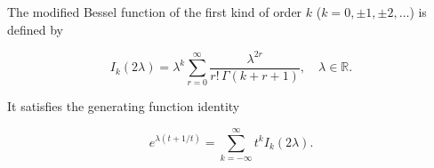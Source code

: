 The modified Bessel function of the first kind of order $k$ ($k = 0, \pm 1, \pm 2, \ldots$) is defined by

$$I_k(2\lambda) = \lambda^k \sum_{r=0}^{\infty} \frac{\lambda^{2r}}{r! \, \Gamma(k + r + 1)}, \quad \lambda \in \mathbb{R}.$$

It satisfies the generating function identity

$$e^{\lambda(t + 1/t)} = \sum_{k=-\infty}^{\infty} t^k I_k(2\lambda).$$
